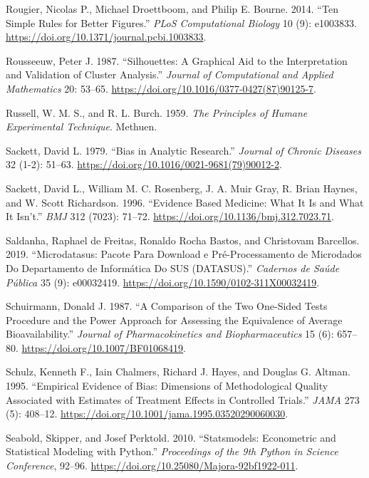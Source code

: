 \documentclass[
]{book}
\newlength{\cslhangindent}
\newenvironment{CSLReferences}[2] %
 {\begin{list}{}{%
  \setlength{\itemindent}{0pt}
  \setlength{\leftmargin}{0pt}
  \setlength{\parsep}{0pt}
  \ifodd #1
   \setlength{\leftmargin}{\cslhangindent}
   \setlength{\itemindent}{-1\cslhangindent}
  \fi
  \setlength{\itemsep}{#2\baselineskip}}}
 {\end{list}}
\begin{document}
\begin{CSLReferences}{1}{1}
Rougier, Nicolas P., Michael Droettboom, and Philip E. Bourne. 2014. {``Ten Simple Rules for Better Figures.''} \emph{PLoS Computational Biology} 10 (9): e1003833. \url{https://doi.org/10.1371/journal.pcbi.1003833}.

Rousseeuw, Peter J. 1987. {``Silhouettes: A Graphical Aid to the Interpretation and Validation of Cluster Analysis.''} \emph{Journal of Computational and Applied Mathematics} 20: 53--65. \url{https://doi.org/10.1016/0377-0427(87)90125-7}.

Russell, W. M. S., and R. L. Burch. 1959. \emph{The Principles of Humane Experimental Technique}. Methuen.

Sackett, David L. 1979. {``Bias in Analytic Research.''} \emph{Journal of Chronic Diseases} 32 (1-2): 51--63. \url{https://doi.org/10.1016/0021-9681(79)90012-2}.

Sackett, David L., William M. C. Rosenberg, J. A. Muir Gray, R. Brian Haynes, and W. Scott Richardson. 1996. {``Evidence Based Medicine: What It Is and What It Isn't.''} \emph{BMJ} 312 (7023): 71--72. \url{https://doi.org/10.1136/bmj.312.7023.71}.

Saldanha, Raphael de Freitas, Ronaldo Rocha Bastos, and Christovam Barcellos. 2019. {``Microdatasus: Pacote Para Download e Pré-Processamento de Microdados Do Departamento de Informática Do {SUS} ({DATASUS}).''} \emph{Cadernos de Saúde Pública} 35 (9): e00032419. \url{https://doi.org/10.1590/0102-311X00032419}.

Schuirmann, Donald J. 1987. {``A Comparison of the Two One-Sided Tests Procedure and the Power Approach for Assessing the Equivalence of Average Bioavailability.''} \emph{Journal of Pharmacokinetics and Biopharmaceutics} 15 (6): 657--80. \url{https://doi.org/10.1007/BF01068419}.

Schulz, Kenneth F., Iain Chalmers, Richard J. Hayes, and Douglas G. Altman. 1995. {``Empirical Evidence of Bias: Dimensions of Methodological Quality Associated with Estimates of Treatment Effects in Controlled Trials.''} \emph{JAMA} 273 (5): 408--12. \url{https://doi.org/10.1001/jama.1995.03520290060030}.

Seabold, Skipper, and Josef Perktold. 2010. {``Statsmodels: Econometric and Statistical Modeling with {Python}.''} \emph{Proceedings of the 9th Python in Science Conference}, 92--96. \url{https://doi.org/10.25080/Majora-92bf1922-011}.


\end{CSLReferences}
\end{document}
